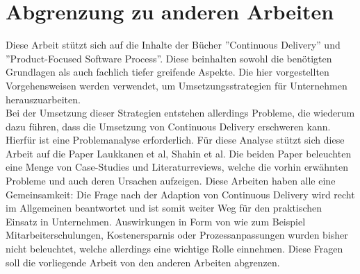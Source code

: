 \section{Abgrenzung zu anderen Arbeiten}
Diese Arbeit stützt sich auf die Inhalte der Bücher ''Continuous Delivery''\cite{Wolff.2016} und ''Product-Focused Software Process''\cite{Jedlitschka.2014}. Diese beinhalten sowohl die benötigten Grundlagen als auch fachlich tiefer greifende Aspekte. Die hier vorgestellten Vorgehensweisen werden verwendet, um Umsetzungsstrategien für Unternehmen herauszuarbeiten. \\ Bei der Umsetzung dieser Strategien entstehen allerdings Probleme, die wiederum dazu führen, dass die Umsetzung von Continuous Delivery erschweren kann. Hierfür ist eine Problemanalyse erforderlich. Für diese Analyse stützt sich diese Arbeit auf die Paper Laukkanen et al\cite{Laukkanen.2017}, Shahin et al\cite{Shahin.2017}. Die beiden Paper beleuchten eine Menge von Case-Studies und Literaturreviews, welche die vorhin erwähnten Probleme und auch deren Ursachen aufzeigen. Diese Arbeiten haben alle eine Gemeinsamkeit: Die Frage nach der Adaption von Continuous Delivery wird recht im Allgemeinen beantwortet und ist somit weiter Weg für den praktischen Einsatz in Unternehmen. Auswirkungen in Form von wie zum Beispiel Mitarbeiterschulungen, Kostenersparnis oder Prozessanpassungen wurden bisher nicht beleuchtet, welche allerdings eine wichtige Rolle einnehmen. Diese Fragen soll die vorliegende Arbeit von den anderen Arbeiten abgrenzen.  